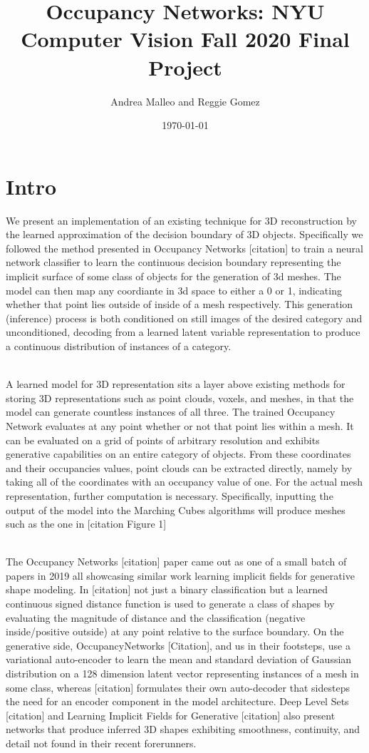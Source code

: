 \documentclass[11pt]{article}
\author{Andrea Malleo and Reggie Gomez}
\date{\today}
\title{Occupancy Networks: NYU Computer Vision Fall 2020 Final Project}
\begin{document}
\maketitle
\section{Intro}

\begin{multicols}{2}
We present an implementation of an existing technique for 3D reconstruction by the learned approximation of the decision boundary of 3D objects. Specifically we followed the method presented in Occupancy Networks [citation] to train a neural network classifier to learn the continuous decision boundary representing the implicit surface of some class of objects for the generation of 3d meshes. The model can then map any coordiante in 3d space to either a 0 or 1, indicating whether that point lies outside of inside of a mesh respectively. This generation (inference) process is both conditioned on still images of the desired category and unconditioned, decoding from a learned latent variable representation to produce a continuous distribution of instances of a category.
\par
\\
A learned model for 3D representation sits a layer above existing methods for storing 3D representations such as point clouds, voxels, and meshes, in that the model can generate countless instances of all three. The trained Occupancy Network evaluates at any point whether or not that point lies within a mesh. It can be evaluated on a grid of points of arbitrary resolution and exhibits generative capabilities on an entire category of objects. From these coordinates and their occupancies values, point clouds can be extracted directly, namely by taking all of the coordinates with an occupancy value of one. For the actual mesh representation, further computation is necessary. Specifically, inputting the output of the model into the Marching Cubes algorithms will produce meshes such as the one in [citation Figure 1]
\par
\\
The Occupancy Networks [citation] paper came out as one of a small batch of papers in 2019 all showcasing similar work learning implicit fields for generative shape modeling. In [citation] not just a binary classification but a learned continuous signed distance function is used to generate a class of shapes by evaluating the magnitude of distance and the classification (negative inside/positive outside) at any point relative to the surface boundary. On the generative side, OccupancyNetworks [Citation], and us in their footsteps, use a variational auto-encoder to learn the mean and standard deviation of Gaussian distribution on a 128 dimension latent vector representing instances of a mesh in some class, whereas [citation] formulates their own auto-decoder that sidesteps the need for an encoder component in the model architecture. Deep Level Sets [citation] and Learning Implicit Fields for Generative [citation] also present networks that produce inferred 3D shapes exhibiting smoothness, continuity, and detail not found in their recent forerunners.


\end{multicols}
\end{document}
